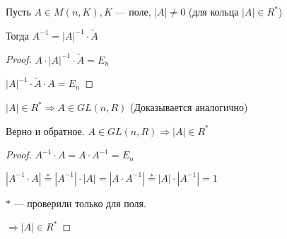\follow Пусть $A \in M(n, K), K$ --- поле, $|A| \neq 0$ (для кольца $|A| \in R^*$)

    Тогда $A^{-1} = |A|^{-1} \cdot \widetilde{A}$
    \begin{proof}
        $A \cdot |A|^{-1} \cdot \widetilde{A} = E_n$
        
        $|A|^{-1} \cdot \widetilde{A} \cdot A = E_n$
    \end{proof}

\follow $|A| \in R^* \Longrightarrow A \in GL (n, R)$ (Доказывается аналогично)


\notice Верно и обратное. $A \in GL(n, R) \Longrightarrow |A| \in R^*$
    \begin{proof}
        $A^{-1} \cdot A = A \cdot A^{-1} = E_n$ 

        $|A^{-1} \cdot A| \stackrel{*}{=} |A^{-1}| \cdot |A| = |A \cdot A^{-1}| \stackrel{*}{=} |A| \cdot |A^{-1}| = 1$

        $*$ --- проверили только для поля.

        $\Longrightarrow |A| \in R^*$ 
        
    \end{proof}
